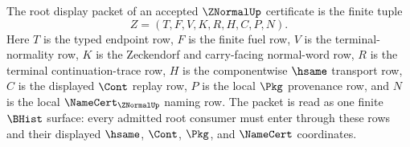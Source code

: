 \begin{definition}\label{def:znormal-root-display-packet}
The root display packet of an accepted $\ZNormalUp$ certificate is the finite tuple
$$
Z=(T,F,V,K,R,H,C,P,N).
$$
Here $T$ is the typed endpoint row, $F$ is the finite fuel row, $V$ is the terminal-normality row, $K$ is the Zeckendorf and carry-facing normal-word row, $R$ is the terminal continuation-trace row, $H$ is the componentwise $\hsame$ transport row, $C$ is the displayed $\Cont$ replay row, $P$ is the local $\Pkg$ provenance row, and $N$ is the local $\NameCert_{\ZNormalUp}$ naming row. The packet is read as one finite $\BHist$ surface: every admitted root consumer must enter through these rows and their displayed $\hsame$, $\Cont$, $\Pkg$, and $\NameCert$ coordinates.
\end{definition}

